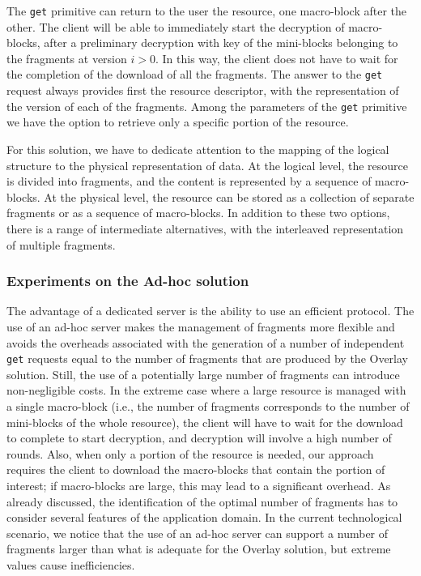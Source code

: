 The {\tt get} primitive can return to the user the resource, one macro-block after the other. The client will be able to immediately start the decryption of macro-blocks, after a preliminary decryption with key  of the mini-blocks belonging to the fragments at version $i>0$. In this way, the client does not have to wait for the completion of the download of all the fragments. The answer to the {\tt get} request always provides first the resource descriptor, with the representation of the version of each of the fragments. Among the parameters of the {\tt get} primitive we have the option to retrieve only a specific portion of the resource.

For this solution, we have to dedicate attention to the mapping of the logical structure to the physical representation of data. At the logical level, the resource is divided into fragments, and the content is represented by a sequence of macro-blocks. At the physical level, the resource can be stored as a collection of separate fragments or as a sequence of macro-blocks. In addition to these two options, there is a range of intermediate alternatives, with the interleaved representation of multiple fragments.

\subsubsection{Experiments on the Ad-hoc solution}
The advantage of a dedicated server is the ability to use an efficient protocol. The use of an ad-hoc server makes the management of fragments more flexible and avoids the overheads associated with the generation of a number of independent {\tt get} requests equal to the number of fragments that are produced by the Overlay solution. Still, the use of a potentially large number of fragments can introduce non-negligible costs. In the extreme case where a large resource is managed with a single macro-block (i.e., the number of fragments corresponds to the number of mini-blocks of the whole resource), the client will have to wait for the download to complete to start decryption, and decryption will involve a high number of rounds. Also, when only a portion of the resource is needed, our approach requires the client to download the macro-blocks that contain the portion of interest; if macro-blocks are large, this may lead to a significant overhead. As already discussed, the identification of the optimal number of fragments has to consider several features of the application domain. In the current technological scenario, we notice that the use of an ad-hoc server can support a number of fragments larger than what is adequate for the Overlay solution, but extreme values cause inefficiencies.

